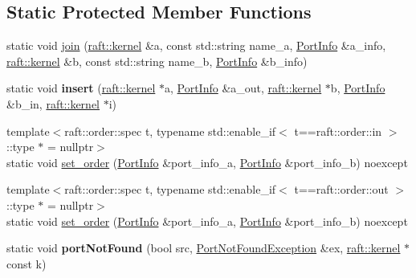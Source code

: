 \subsection*{Static Protected Member Functions}
\begin{DoxyCompactItemize}
\item 
static void \hyperlink{class_map_base_a2624d7b81f0078dcc78e524045403e28}{join} (\hyperlink{classraft_1_1kernel}{raft\+::kernel} \&a, const std\+::string name\+\_\+a, \hyperlink{struct_port_info}{Port\+Info} \&a\+\_\+info, \hyperlink{classraft_1_1kernel}{raft\+::kernel} \&b, const std\+::string name\+\_\+b, \hyperlink{struct_port_info}{Port\+Info} \&b\+\_\+info)
\item 
\hypertarget{class_map_base_a4c6452a79012d0a98eb6c406e008d87e}{}\label{class_map_base_a4c6452a79012d0a98eb6c406e008d87e} 
static void {\bfseries insert} (\hyperlink{classraft_1_1kernel}{raft\+::kernel} $\ast$a, \hyperlink{struct_port_info}{Port\+Info} \&a\+\_\+out, \hyperlink{classraft_1_1kernel}{raft\+::kernel} $\ast$b, \hyperlink{struct_port_info}{Port\+Info} \&b\+\_\+in, \hyperlink{classraft_1_1kernel}{raft\+::kernel} $\ast$i)
\item 
{\footnotesize template$<$raft\+::order\+::spec t, typename std\+::enable\+\_\+if$<$ t==raft\+::order\+::in $>$\+::type $\ast$  = nullptr$>$ }\\static void \hyperlink{class_map_base_ab2bdd75e5f2f7a84ec7146625f85dbde}{set\+\_\+order} (\hyperlink{struct_port_info}{Port\+Info} \&port\+\_\+info\+\_\+a, \hyperlink{struct_port_info}{Port\+Info} \&port\+\_\+info\+\_\+b) noexcept
\item 
{\footnotesize template$<$raft\+::order\+::spec t, typename std\+::enable\+\_\+if$<$ t==raft\+::order\+::out $>$\+::type $\ast$  = nullptr$>$ }\\static void \hyperlink{class_map_base_ab2bdd75e5f2f7a84ec7146625f85dbde}{set\+\_\+order} (\hyperlink{struct_port_info}{Port\+Info} \&port\+\_\+info\+\_\+a, \hyperlink{struct_port_info}{Port\+Info} \&port\+\_\+info\+\_\+b) noexcept
\item 
\hypertarget{class_map_base_aceaf697d85cb24d8e62e2983980cca03}{}\label{class_map_base_aceaf697d85cb24d8e62e2983980cca03} 
static void {\bfseries port\+Not\+Found} (bool src, \hyperlink{class_port_not_found_exception}{Port\+Not\+Found\+Exception} \&ex, \hyperlink{classraft_1_1kernel}{raft\+::kernel} $\ast$const k)
\end{DoxyCompactItemize}
